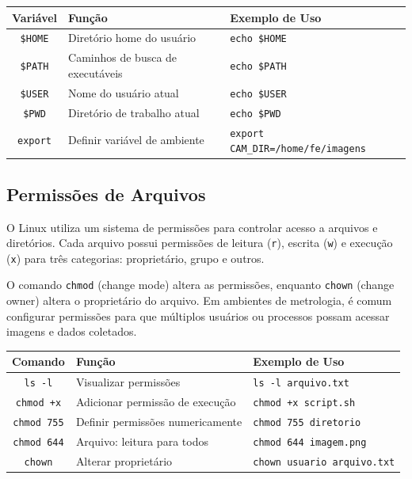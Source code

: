 \documentclass[12pt]{article}
\begin{document}
\begin{cmdbox}
\begin{tabularx}{\linewidth}{@{}C >{\raggedright\arraybackslash}X >{\raggedright\arraybackslash}X@{}}
\toprule
\textbf{Variável} & \textbf{Função} & \textbf{Exemplo de Uso} \\
\midrule
\texttt{\$HOME} & Diretório home do usuário & \texttt{echo \$HOME} \\
\texttt{\$PATH} & Caminhos de busca de executáveis & \texttt{echo \$PATH} \\
\texttt{\$USER} & Nome do usuário atual & \texttt{echo \$USER} \\
\texttt{\$PWD} & Diretório de trabalho atual & \texttt{echo \$PWD} \\
\texttt{export} & Definir variável de ambiente & \texttt{export CAM\_DIR=/home/fe/imagens} \\
\bottomrule
\end{tabularx}
\end{cmdbox}

\subsection{Permissões de Arquivos}

O Linux utiliza um sistema de permissões para controlar acesso a arquivos e diretórios. Cada arquivo possui permissões de leitura (\texttt{r}), escrita (\texttt{w}) e execução (\texttt{x}) para três categorias: proprietário, grupo e outros.

O comando \texttt{chmod} (change mode) altera as permissões, enquanto \texttt{chown} (change owner) altera o proprietário do arquivo. Em ambientes de metrologia, é comum configurar permissões para que múltiplos usuários ou processos possam acessar imagens e dados coletados.

\begin{cmdbox}
\begin{tabularx}{\linewidth}{@{}C >{\raggedright\arraybackslash}X >{\raggedright\arraybackslash}X@{}}
\toprule
\textbf{Comando} & \textbf{Função} & \textbf{Exemplo de Uso} \\
\midrule
\texttt{ls -l} & Visualizar permissões & \texttt{ls -l arquivo.txt} \\
\texttt{chmod +x} & Adicionar permissão de execução & \texttt{chmod +x script.sh} \\
\texttt{chmod 755} & Definir permissões numericamente & \texttt{chmod 755 diretorio} \\
\texttt{chmod 644} & Arquivo: leitura para todos & \texttt{chmod 644 imagem.png} \\
\texttt{chown} & Alterar proprietário & \texttt{chown usuario arquivo.txt} \\
\bottomrule
\end{tabularx}
\end{cmdbox}
\end{document}
